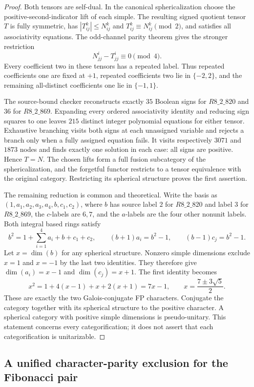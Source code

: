 \begin{proof}
Both tensors are self-dual. In the canonical sphericalization
choose the positive-second-indicator lift of each simple. The
resulting signed quotient tensor $T$ is fully symmetric, has
$|T_{ij}^k|\leq N_{ij}^k$ and $T_{ij}^k\equiv N_{ij}^k\pmod2$,
and satisfies all associativity equations. The odd-channel parity
theorem \cite[Theorem~3.9]{TPEParity} gives the stronger restriction
\[
N_{jj}^i-T_{jj}^i\equiv0\pmod4.
\]
Every coefficient two in these tensors has a repeated label.
Thus repeated coefficients one are fixed at $+1$, repeated
coefficients two lie in $\{-2,2\}$, and the remaining
all-distinct coefficients one lie in $\{-1,1\}$.

The source-bound checker reconstructs exactly $35$ Boolean signs
for $R8\_2\_820$ and $36$ for $R8\_2\_869$. Expanding every
ordered associativity identity and reducing sign squares to one
leaves $215$ distinct integer polynomial equations for either
tensor. Exhaustive branching visits both signs at each unassigned
variable and rejects a branch only when a fully assigned equation
fails. It visits respectively $3071$ and $1873$ nodes and finds
exactly one solution in each case: all signs are positive.
Hence $T=N$. The chosen lifts form a full fusion subcategory of
the sphericalization, and the forgetful functor restricts to a
tensor equivalence with the original category. Restricting its
spherical structure proves the first assertion.

The remaining reduction is common and theoretical. Write the
basis as $(1,a_1,a_2,a_3,a_4,b,c_1,c_2)$, where $b$ has source
label $2$ for $R8\_2\_820$ and label $3$ for $R8\_2\_869$,
the $c$-labels are $6,7$, and the $a$-labels are the four other
nonunit labels. Both integral based rings satisfy
\[
b^2=1+\sum_{i=1}^4a_i+b+c_1+c_2,\qquad
(b+1)a_i=b^2-1,\qquad(b-1)c_j=b^2-1.
\]
Let $x=\dim(b)$ for any spherical structure. Nonzero simple
dimensions exclude $x=1$ and $x=-1$ by the last two identities.
They therefore give $\dim(a_i)=x-1$ and $\dim(c_j)=x+1$.
The first identity becomes
\[
x^2=1+4(x-1)+x+2(x+1)=7x-1,
\qquad x=\frac{7\pm3\sqrt5}{2}.
\]
These are exactly the two Galois-conjugate FP characters.
Conjugate the category together with its spherical structure to
the positive character. A spherical category with positive simple
dimensions is pseudo-unitary. This statement concerns every
categorification; it does not assert that each categorification
is unitarizable.
\end{proof}

\subsection{A unified character-parity exclusion for the Fibonacci pair}

